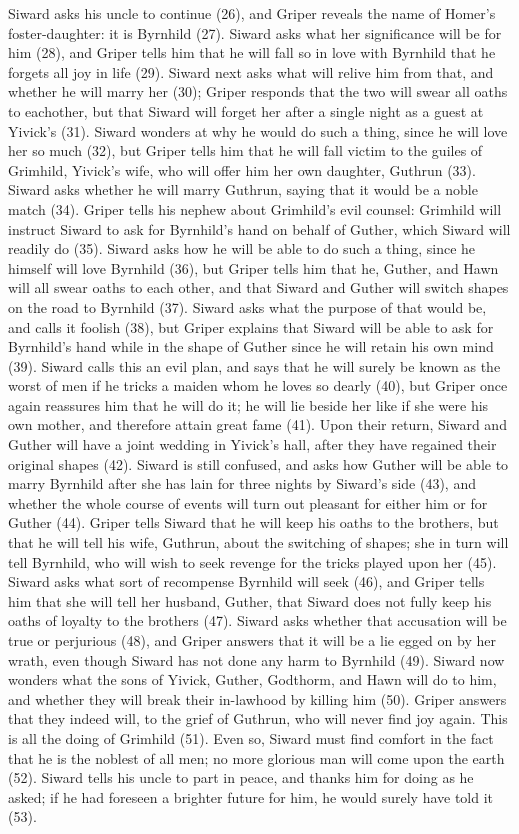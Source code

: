 Siward asks his uncle to continue (26), and Griper reveals the name of Homer’s foster-daughter: it is Byrnhild (27).  Siward asks what her significance will be for him (28), and Griper tells him that he will fall so in love with Byrnhild that he forgets all joy in life (29).  Siward next asks what will relive him from that, and whether he will marry her (30); Griper responds that the two will swear all oaths to eachother, but that Siward will forget her after a single night as a guest at Yivick’s (31).  Siward wonders at why he would do such a thing, since he will love her so much (32), but Griper tells him that he will fall victim to the guiles of Grimhild, Yivick’s wife, who will offer him her own daughter, Guthrun (33).  Siward asks whether he will marry Guthrun, saying that it would be a noble match (34).  Griper tells his nephew about Grimhild’s evil counsel: Grimhild will instruct Siward to ask for Byrnhild’s hand on behalf of Guther, which Siward will readily do (35).  Siward asks how he will be able to do such a thing, since he himself will love Byrnhild (36), but Griper tells him that he, Guther, and Hawn will all swear oaths to each other, and that Siward and Guther will switch shapes on the road to Byrnhild (37).  Siward asks what the purpose of that would be, and calls it foolish (38), but Griper explains that Siward will be able to ask for Byrnhild’s hand while in the shape of Guther since he will retain his own mind (39).  Siward calls this an evil plan, and says that he will surely be known as the worst of men if he tricks a maiden whom he loves so dearly (40), but Griper once again reassures him that he will do it; he will lie beside her like if she were his own mother, and therefore attain great fame (41).  Upon their return, Siward and Guther will have a joint wedding in Yivick’s hall, after they have regained their original shapes (42).  Siward is still confused, and asks how Guther will be able to marry Byrnhild after she has lain for three nights by Siward’s side (43), and whether the whole course of events will turn out pleasant for either him or for Guther (44).  Griper tells Siward that he will keep his oaths to the brothers, but that he will tell his wife, Guthrun, about the switching of shapes; she in turn will tell Byrnhild, who will wish to seek revenge for the tricks played upon her (45).  Siward asks what sort of recompense Byrnhild will seek (46), and Griper tells him that she will tell her husband, Guther, that Siward does not fully keep his oaths of loyalty to the brothers (47).  Siward asks whether that accusation will be true or perjurious (48), and Griper answers that it will be a lie egged on by her wrath, even though Siward has not done any harm to Byrnhild (49).  Siward now wonders what the sons of Yivick, Guther, Godthorm, and Hawn will do to him, and whether they will break their in-lawhood by killing him (50).  Griper answers that they indeed will, to the grief of Guthrun, who will never find joy again.  This is all the doing of Grimhild (51).  Even so, Siward must find comfort in the fact that he is the noblest of all men; no more glorious man will come upon the earth (52).  Siward tells his uncle to part in peace, and thanks him for doing as he asked; if he had foreseen a brighter future for him, he would surely have told it (53).

